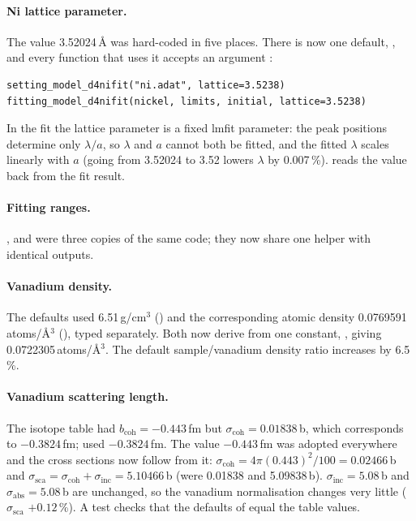 \documentclass[11pt,a4paper]{article}
\begin{document}
\paragraph{ Ni lattice parameter.} \newbeh{} The value
3.52024\,\AA{} was hard-coded in five places. There is now one default,
, and every
function that uses it accepts an argument :
\begin{lstlisting}
setting_model_d4nifit("ni.adat", lattice=3.5238)
fitting_model_d4nifit(nickel, limits, initial, lattice=3.5238)
\end{lstlisting}
In the fit the lattice parameter is a fixed lmfit parameter: the peak
positions determine only $\lambda/a$, so $\lambda$ and $a$ cannot both be
fitted, and the fitted $\lambda$ scales linearly with $a$ (going from
3.52024 to 3.52 lowers $\lambda$ by 0.007\,\%). 
reads the value back from the fit result.

\paragraph{ Fitting ranges.} ,
 and  were three copies of the same code;
they now share one helper with identical outputs.

\label{sec:physics}

\paragraph{ Vanadium density.} \newbeh{} The defaults used
6.51\,g/cm$^3$ () and the corresponding atomic density
0.0769591\,atoms/\AA$^3$ (), typed separately. Both now
derive from one constant, , giving
0.0722305\,atoms/\AA$^3$. The default sample/vanadium density ratio
 increases by 6.5\,\%.

\paragraph{ Vanadium scattering length.} \newbeh{} The isotope
table had $b_\mathrm{coh}=-0.443$\,fm but $\sigma_\mathrm{coh}=0.01838$\,b,
which corresponds to $-0.3824$\,fm;  used $-0.3824$\,fm.
The value $-0.443$\,fm was adopted everywhere and the cross sections now
follow from it: $\sigma_\mathrm{coh} = 4\pi(0.443)^2/100 = 0.02466$\,b and
$\sigma_\mathrm{sca} = \sigma_\mathrm{coh}+\sigma_\mathrm{inc} = 5.10466$\,b
(were 0.01838 and 5.09838\,b). $\sigma_\mathrm{inc}=5.08$\,b and
$\sigma_\mathrm{abs}=5.08$\,b are unchanged, so the vanadium normalisation
changes very little ($\sigma_\mathrm{sca}$ $+0.12$\,\%). A test checks that
the defaults of  equal the table values.
\end{document}

